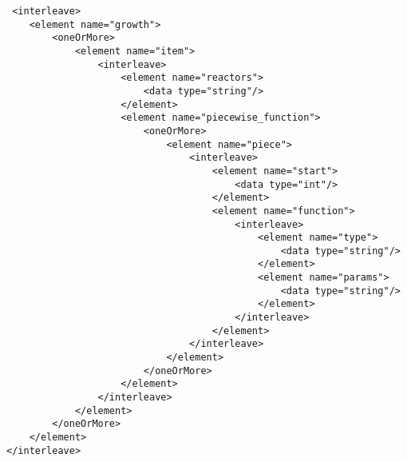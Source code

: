 \documentclass[12pt,letterpaper]{article}
\newenvironment{code}{\captionsetup{type=listing}}{}
\begin{document}
\begin{code}

\begin{verbatim}
 <interleave>
    <element name="growth">
        <oneOrMore>
            <element name="item">
                <interleave>
                    <element name="reactors">
                        <data type="string"/>
                    </element>
                    <element name="piecewise_function">
                        <oneOrMore>
                            <element name="piece">
                                <interleave>
                                    <element name="start">
                                        <data type="int"/>
                                    </element>
                                    <element name="function">
                                        <interleave>
                                            <element name="type">
                                                <data type="string"/>
                                            </element>
                                            <element name="params">
                                                <data type="string"/>
                                            </element>
                                        </interleave>
                                    </element>
                                </interleave>
                            </element>
                        </oneOrMore>
                    </element>
                </interleave>
            </element>
        </oneOrMore>
    </element>
</interleave>
\end{verbatim}
\label{code:fun_reac}
\end{code}
\end{document}
